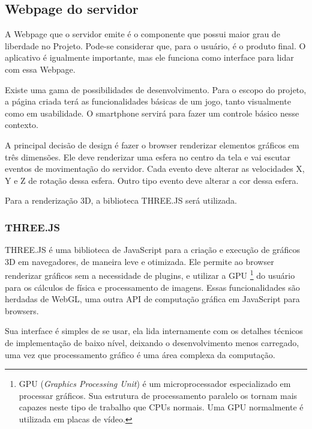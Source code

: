 \documentclass[a4paper,12pt]{article}
\begin{document}
\subsection{Webpage do servidor}

A Webpage que o servidor emite é o componente que possui maior grau de liberdade no Projeto. Pode-se considerar que, para o usuário, é o produto final. O aplicativo é igualmente importante, mas ele funciona como interface para lidar com essa Webpage.

Existe uma gama de possibilidades de desenvolvimento. Para o escopo do projeto, a página criada terá as funcionalidades básicas de um jogo, tanto visualmente como em usabilidade. O smartphone servirá para fazer um controle básico nesse contexto.

A principal decisão de design é fazer o browser renderizar elementos gráficos em três dimensões. Ele deve renderizar uma esfera no centro da tela e vai escutar eventos de movimentação do servidor. Cada evento deve alterar as velocidades X, Y e Z de rotação dessa esfera. Outro tipo evento deve alterar a cor dessa esfera.%


Para a renderização 3D, a biblioteca THREE.JS será utilizada.


\subsubsection{THREE.JS}

THREE.JS é uma biblioteca de JavaScript para a criação e execução de gráficos 3D em navegadores, de maneira leve e otimizada. Ele permite ao browser renderizar gráficos sem a necessidade de plugins, e utilizar a GPU \footnote{GPU (\emph{Graphics Processing Unit}) é um microprocessador especializado em processar gráficos. Sua estrutura de processamento paralelo os tornam mais capazes neste tipo de trabalho que CPUs normais. Uma GPU normalmente é utilizada em placas de vídeo.} do usuário para os cálculos de física e processamento de imagens. Essas funcionalidades são herdadas de WebGL, uma outra API de computação gráfica em JavaScript para browsers.

Sua interface é simples de se usar, ela lida internamente com os detalhes técnicos de implementação de baixo nível, deixando o desenvolvimento menos carregado, uma vez que processamento gráfico é uma área complexa da computação.
\end{document}
